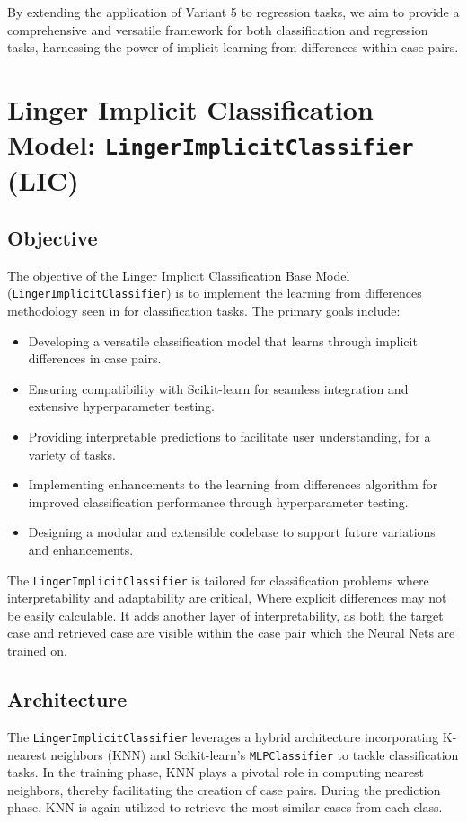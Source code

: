 \documentclass[a4paper, 12pt]{report}
\begin{document}
By extending the application of Variant 5 to regression tasks, we aim to provide a comprehensive and versatile framework for both classification and regression tasks, 
harnessing the power of implicit learning from differences within case pairs.

\section{Linger Implicit Classification Model: \texttt{LingerImplicitClassifier} (LIC)}
\label{sec:lingerImplicit_classification_base_model}

\subsection{Objective}
The objective of the Linger Implicit Classification Base Model (\texttt{LingerImplicitClassifier}) is to 
implement the learning from differences methodology seen in \cite{ye2021learning} for classification tasks. The primary goals include:

\begin{itemize}
    \item Developing a versatile classification model that learns through implicit differences in case pairs.
    \item Ensuring compatibility with Scikit-learn for seamless integration and extensive hyperparameter testing.
    \item Providing interpretable predictions to facilitate user understanding, for a variety of tasks.
    \item Implementing enhancements to the learning from differences algorithm for improved classification performance through hyperparameter testing.
    \item Designing a modular and extensible codebase to support future variations and enhancements.
\end{itemize}

The \texttt{LingerImplicitClassifier} is tailored for classification problems where interpretability and adaptability are critical, Where explicit differences may not be easily calculable.
It adds another layer of interpretability, as both the target case and retrieved case are visible within the case pair which the Neural Nets are trained on.

\subsection{Architecture}
The \texttt{LingerImplicitClassifier} leverages a hybrid architecture incorporating K-nearest neighbors (KNN) and Scikit-learn's \texttt{MLPClassifier} to tackle classification tasks.
In the training phase, KNN plays a pivotal role in computing nearest neighbors, thereby facilitating the creation of case pairs.
During the prediction phase, KNN is again utilized to retrieve the most similar cases from each class.
\end{document}

